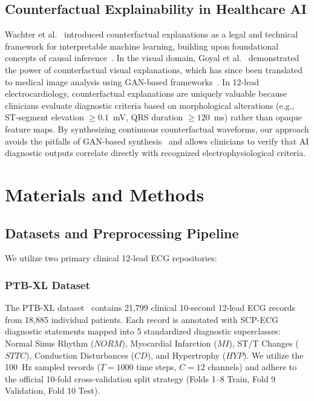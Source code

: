 \documentclass[5p,twocolumn,10pt]{elsarticle}
\begin{document}
\subsection{Counterfactual Explainability in Healthcare AI}
Wachter et al.~\cite{wachter2017counterfactual} introduced counterfactual explanations as a legal and technical framework for interpretable machine learning, building upon foundational concepts of causal inference~\cite{pearl2009causality}. In the visual domain, Goyal et al.~\cite{goyal2019counterfactual} demonstrated the power of counterfactual visual explanations, which has since been translated to medical image analysis using GAN-based frameworks~\cite{mertes2022gan, mothilal2020explaining}. In 12-lead electrocardiology, counterfactual explanations are uniquely valuable because clinicians evaluate diagnostic criteria based on morphological alterations (e.g., ST-segment elevation $\ge 0.1$~mV, QRS duration $\ge 120$~ms) rather than opaque feature maps. By synthesizing continuous counterfactual waveforms, our approach avoids the pitfalls of GAN-based synthesis~\cite{korkmaz2021deep} and allows clinicians to verify that AI diagnostic outputs correlate directly with recognized electrophysiological criteria.

\section{Materials and Methods}
\label{sec:methods}

\subsection{Datasets and Preprocessing Pipeline}
We utilize two primary clinical 12-lead ECG repositories:

\subsubsection{PTB-XL Dataset}
The PTB-XL dataset~\cite{wagner2020ptb} contains 21,799 clinical 10-second 12-lead ECG records from 18,885 individual patients. Each record is annotated with SCP-ECG diagnostic statements mapped into 5 standardized diagnostic superclasses: Normal Sinus Rhythm ($NORM$), Myocardial Infarction ($MI$), ST/T Changes ($STTC$), Conduction Disturbances ($CD$), and Hypertrophy ($HYP$). We utilize the 100~Hz sampled records ($T = 1000$ time steps, $C = 12$ channels) and adhere to the official 10-fold cross-validation split strategy (Folds 1--8 Train, Fold 9 Validation, Fold 10 Test).
\end{document}
